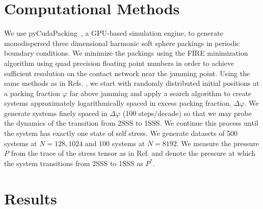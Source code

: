 \section{Computational Methods}

We use pyCudaPacking~\cite{charbonneau_universal_2012}, a GPU-based simulation engine, to generate monodispersed three dimensional harmonic soft sphere packings in periodic boundary conditions. 
We minimize the packings using the FIRE minimization algorithm \cite{bitzek_structural_2006} using quad precision floating point numbers in order to achieve sufficient resolution on the contact network near the jamming point.
Using the same methods as in Refs. \cite{sartor_mean-field_2021,morse_echoes_2017}, we start with randomly distributed initial positions at a packing fraction $\varphi$ far above jamming and apply a search algorithm to create systems approximately logarithmically spaced in excess packing fraction, $\Delta\varphi$. We generate systems finely spaced in $\Delta\varphi$ (100 steps/decade) so that we may probe the dynamics of the transition from 2SSS to 1SSS.  
We continue this process until the system has exactly one state of self stress. We generate datasets of 500 systems at $N={128, 1024}$ and 100 systems at $N=8192$.  We measure the pressure $P$ from the trace of the stress tensor as in Ref. \cite{ohern_jamming_2003} and denote the pressure at which the system transitions from 2SSS to 1SSS as $P^*$.


\section{Results}


